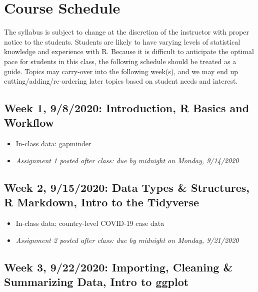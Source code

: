 \documentclass[11pt,]{article}
\providecommand{\tightlist}{%
  \setlength{\itemsep}{0pt}\setlength{\parskip}{0pt}}
\begin{document}
\hypertarget{course-schedule}{%
\section{Course Schedule}\label{course-schedule}}

The syllabus is subject to change at the discretion of the instructor
with proper notice to the students. Students are likely to have varying
levels of statistical knowledge and experience with R. Because it is
difficult to anticipate the optimal pace for students in this class, the
following schedule should be treated as a guide. Topics may carry-over
into the following week(s), and we may end up cutting/adding/re-ordering
later topics based on student needs and interest.

\hypertarget{week-1-982020-introduction-r-basics-and-workflow}{%
\subsection{Week 1, 9/8/2020: Introduction, R Basics and
Workflow}\label{week-1-982020-introduction-r-basics-and-workflow}}

\begin{itemize}
\tightlist
\item
  In-class data: gapminder
\item
  \emph{Assignment 1 posted after class: due by midnight on Monday,
  9/14/2020} \medskip
\end{itemize}

\hypertarget{week-2-9152020-data-types-structures-r-markdown-intro-to-the-tidyverse}{%
\subsection{Week 2, 9/15/2020: Data Types \& Structures, R Markdown,
Intro to the
Tidyverse}\label{week-2-9152020-data-types-structures-r-markdown-intro-to-the-tidyverse}}

\begin{itemize}
\tightlist
\item
  In-class data: country-level COVID-19 case data
\item
  \emph{Assignment 2 posted after class: due by midnight on Monday,
  9/21/2020} \medskip
\end{itemize}

\hypertarget{week-3-9222020-importing-cleaning-summarizing-data-intro-to-ggplot}{%
\subsection{Week 3, 9/22/2020: Importing, Cleaning \& Summarizing Data,
Intro to
ggplot}\label{week-3-9222020-importing-cleaning-summarizing-data-intro-to-ggplot}}
\end{document}
